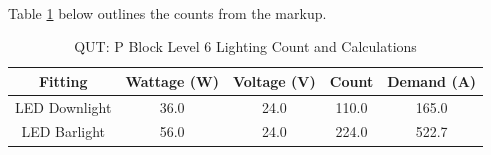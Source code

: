 \paragraph{}
Table \ref{table:QUTlvl6-count} below outlines the counts from the markup. 

\begin{table}[!ht]
	\centering
	\renewcommand{\arraystretch}{2}
	\begin{tabular}{|c|c|c|c|c|}
		\hline
		\textbf{Fitting} & \textbf{Wattage (W)} & \textbf{Voltage (V)} & \textbf{Count} & \textbf{Demand (A)} \\ \hline
		LED Downlight & 36.0 & 24.0 & 110.0 & 165.0 \\ \hline
		LED Barlight & 56.0 & 24.0 & 224.0 & 522.7 \\ \hline
	\end{tabular}

	\caption{QUT: P Block Level 6 Lighting Count and Calculations}
	\label{table:QUTlvl6-count}
\end{table} 